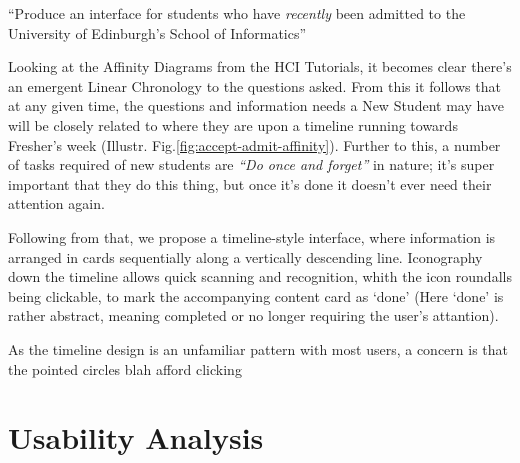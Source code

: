 \documentclass[a4paper, notoc]{tufte-handout}
\begin{document}
``Produce an interface for students who have \textit{recently} been admitted to the 
University of Edinburgh's School of Informatics''

\vspace{1em}

Looking at the Affinity Diagrams from the HCI Tutorials, it becomes clear there's 
an emergent Linear Chronology to the questions asked. From this it follows that at 
any given time, the questions and information needs a New Student 
may have will be closely related to where they are upon a timeline running towards 
Fresher's week (Illustr. Fig.\ref{fig:accept-admit-affinity}).
 Further to this, a number of tasks required of new students are \textit{``Do once 
and forget''} in nature; it's super important that they do this thing, but once it's done
it doesn't ever need their attention again.

Following from that, we propose a timeline-style interface, where information is arranged 
in cards sequentially along a vertically descending line. Iconography down the timeline 
allows quick scanning and recognition, whith the icon roundalls being clickable, to mark 
the accompanying content card as `done' (Here `done' is rather abstract, meaning completed
or no longer requiring the user's attantion).

As the timeline design is an unfamiliar pattern with most users, a concern is that the 
pointed circles blah afford clicking

%



\section{Usability Analysis}

\end{document}
